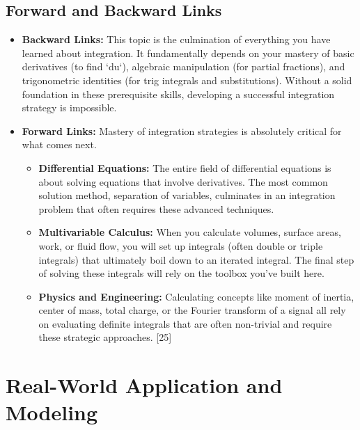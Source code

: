 \documentclass{article}
\begin{document}
\subsection{Forward and Backward Links}
\begin{itemize}
    \item \textbf{Backward Links:} This topic is the culmination of everything you have learned about integration. It fundamentally depends on your mastery of basic derivatives (to find `du`), algebraic manipulation (for partial fractions), and trigonometric identities (for trig integrals and substitutions). Without a solid foundation in these prerequisite skills, developing a successful integration strategy is impossible.
    \item \textbf{Forward Links:} Mastery of integration strategies is absolutely critical for what comes next.
    \begin{itemize}
        \item \textbf{Differential Equations:} The entire field of differential equations is about solving equations that involve derivatives. The most common solution method, separation of variables, culminates in an integration problem that often requires these advanced techniques.
        \item \textbf{Multivariable Calculus:} When you calculate volumes, surface areas, work, or fluid flow, you will set up integrals (often double or triple integrals) that ultimately boil down to an iterated integral. The final step of solving these integrals will rely on the toolbox you've built here.
        \item \textbf{Physics and Engineering:} Calculating concepts like moment of inertia, center of mass, total charge, or the Fourier transform of a signal all rely on evaluating definite integrals that are often non-trivial and require these strategic approaches. [25]
    \end{itemize}
\end{itemize}

\section{Real-World Application and Modeling}
\end{document}
